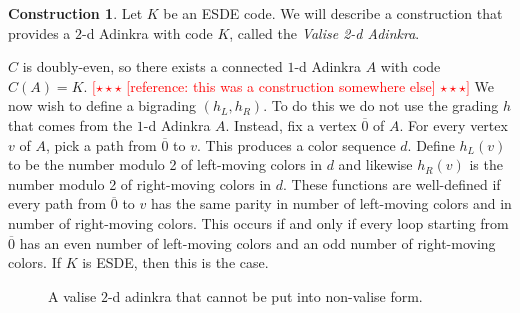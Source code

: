 \documentclass[12pt,twoside,singlespace]{article}
\numberwithin{equation}{section}
\theoremstyle{definition}
\newtheorem{construction}[equation]{Construction}
\newcommand{\com}[1]{\textcolor{red}{$[\star \star \star$ #1 $\star \star \star]$}}
\begin{document}
\begin{construction}
\label{cons:valise}
Let $K$ be an ESDE code.  We will describe a construction that provides a $2$-d Adinkra with code $K$, called the {\em Valise 2-d Adinkra}.

$C$ is doubly-even, so there exists a connected $1$-d Adinkra $A$ with code $C(A) = K$. \com{ [reference: this was a construction somewhere else]} We now wish to define a bigrading $(h_L,h_R)$.  To do this we do not use the grading $h$ that comes from the $1$-d Adinkra $A$.  Instead, fix a vertex $\overline{0}$ of $A$.  For every vertex $v$ of $A$, pick a path from $\overline{0}$ to $v$.  This produces a color sequence $d$.  Define $h_L(v)$ to be the number modulo 2 of left-moving colors in $d$ and likewise $h_R(v)$ is the number modulo 2 of right-moving colors in $d$.  These functions are well-defined if every path from $\overline{0}$ to $v$ has the same parity in number of left-moving colors and in number of right-moving colors.  This occurs if and only if every loop starting from $\overline{0}$ has an even number of left-moving colors and an odd number of right-moving colors.  If $K$ is ESDE, then this is the case.
\end{construction}

\begin{figure}[htb]
\begin{center}

\caption{A valise $2$-d adinkra that cannot be put into non-valise form.\label{fig:tight valise}}
\end{center}
\end{figure}
\end{document}
